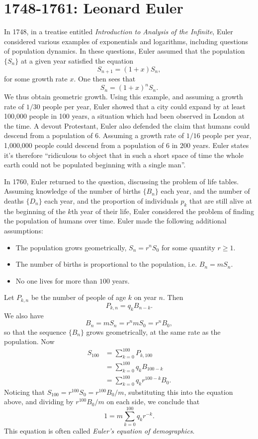 \section{1748-1761: Leonard Euler}

In 1748, in a treatise entitled \emph{Introduction to Analysis of the Infinite}, Euler considered various examples of exponentials and logarithms, including questions of population dynamics. In these questions, Euler assumed that the population $\{ S_n \}$ at a given year satisfied the equation
%
\[ S_{n+1} = (1 + x) S_n, \]
%
for some growth rate $x$. One then sees that
%
\[ S_n = (1 + x)^n S_n. \]
%
We thus obtain geometric growth. Using this example, and assuming a growth rate of $1/30$ people per year, Euler showed that a city could expand by at least 100,000 people in 100 years, a situation which had been observed in London at the time. A devout Protestant, Euler also defended the claim that humans could descend from a population of 6. Assuming a growth rate of $1/16$ people per year, 1,000,000 people could descend from a population of 6 in $200$ years. Euler states it's therefore ``ridiculous to object that in such a short space of time the whole earth could not be populated beginning with a single man''.

In 1760, Euler returned to the question, discussing the problem of life tables. Assuming knowledge of the number of births $\{ B_n \}$ each year, and the number of deaths $\{ D_n \}$ each year, and the proportion of individuals $p_k$ that are still alive at the beginning of the $k$th year of their life, Euler considered the problem of finding the population of humans over time. Euler made the following additional assumptions:
%
\begin{itemize}
    \item The population grows geometrically, $S_n = r^n S_0$ for some quantity $r \geq 1$.

    \item The number of births is proportional to the population, i.e. $B_n = m S_n$.

    \item No one lives for more than $100$ years.
\end{itemize}
%
Let $P_{k,n}$ be the number of people of age $k$ on year $n$. Then
%
\[ P_{k,n} = q_k B_{n-k}. \]
%
We also have
%
\[ B_n = m S_n = r^n m S_0 = r^n B_0, \]
%
so that the sequence $\{ B_n \}$ grows geometrically, at the same rate as the population. Now
%
\begin{align*}
    S_{100} &= \sum_{k =0}^{100} P_{k,100}\\
    &= \sum_{k = 0}^{100} q_k B_{100 - k}\\
    &= \sum_{k = 0}^{100} q_k r^{100 - k} B_0.
\end{align*}
%
Noticing that $S_{100} = r^{100} S_0 = r^{100} B_0 / m$, substituting this into the equation above, and dividing by $r^{100} B_0 / m$ on each side, we conclude that
%
\[ 1 = m \sum_{k = 0}^{100} q_k r^{-k}. \]
%
This equation is often called \emph{Euler's equation of demographics}.

